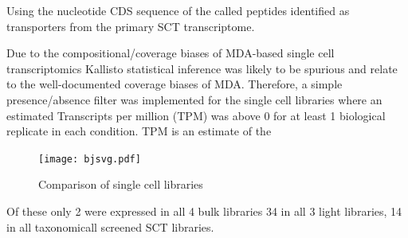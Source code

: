 Using the nucleotide CDS sequence of the called peptides identified as transporters
from the primary SCT transcriptome. 

Due to the compositional/coverage biases of MDA-based single cell transcriptomics 
Kallisto statistical inference was likely to be spurious and relate to the 
well-documented coverage biases of MDA. Therefore, a simple presence/absence
filter was implemented for the single cell libraries where an estimated
Transcripts per million (TPM) was above 0 for at least 1 biological replicate
in each condition. 
TPM is an estimate of the 

\begin{figure}
	\texttt{[image: bjsvg.pdf]}
    \caption[Jasper-Shannon Divergence of Single Cell Libararies]{Comparison of single cell libraries}
\label{fig:jsd}
\end{figure}




Of these only 2 were expressed in all 4 bulk libraries 34 in all 3 light libraries, 14 in all taxonomicall screened SCT libraries.

